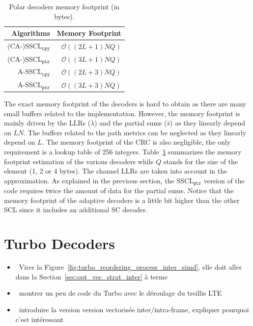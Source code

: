 \begin{table}[htp]
  \centering
  \caption{Polar decoders memory footprint (in bytes).}
  \label{tab:polar_scl_memory_footprint}
   \begin{tabular}{r r}
    \textbf{Algorithms}        & \textbf{Memory Footprint} \\
    \hline
    \hline
    (CA-)SSCL$_{\texttt{cpy}}$ & $\mathcal{O}((2L + 1)NQ)$ \\
    (CA-)SSCL$_{\texttt{ptr}}$ & $\mathcal{O}((3L + 1)NQ)$ \\
    A-SSCL$_{\texttt{cpy}}$    & $\mathcal{O}((2L + 3)NQ)$ \\
    A-SSCL$_{\texttt{ptr}}$    & $\mathcal{O}((3L + 3)NQ)$ \\
  \end{tabular}
\end{table}

The exact memory footprint of the decoders is hard to obtain as there are many
small buffers related to the implementation. However, the memory footprint is
mainly driven by the LLRs ($\lambda$) and the partial sums ($\hat{s}$) as they
linearly depend on $LN$. The buffers related to the path metrics can be
neglected as they linearly depend on $L$. The memory footprint of the CRC is
also negligible, the only requirement is a lookup table of 256 integers.
Table~\ref{tab:polar_scl_memory_footprint} summarizes the memory footprint
estimation of the various decoders while $Q$ stands for the size of the element
(1, 2 or 4 bytes). The channel LLRs are taken into account in the approximation.
As explained in the previous section, the SSCL$_{\texttt{ptr}}$ version of the
code requires twice the amount of data for the partial sums. Notice that the
memory footprint of the adaptive decoders is a little bit higher than the other
SCL since it includes an additional SC decoder.

\section{Turbo Decoders}

\begin{itemize}
  \item \cmark~Virer la Figure~\ref{fig:turbo_reordering_process_inter_simd},
    elle doit aller dans la Section~\ref{sec:opt_vec_strat_inter} à terme
  \item \xmark~montrer un peu de code du Turbo avec le déroulage du treillis LTE
  \item \xmark~introduire la version version vectorisée inter/intra-frame,
    expliquer pourquoi c'est intéressant
\end{itemize}

